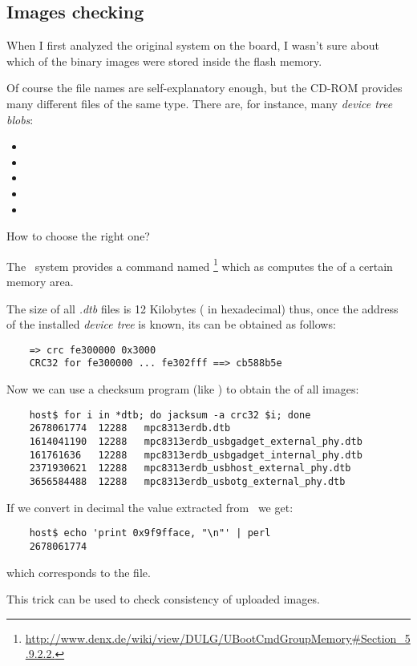 \subsection{ Images checking } \label{sub:ImagesChecking}

    When I first analyzed the original system on the board, I
    wasn't sure about which of the binary images were stored
    inside the flash memory.

    Of course the file names are self-explanatory enough, but the
    CD-ROM provides many different files of the same type. There
    are, for instance, many \emph{device tree blobs}:
    \begin{itemize}
        \item {}
        \item {}
        \item {}
        \item {}
        \item {}
    \end{itemize}
    How to choose the right one?

    The \uBoot\ system provides a command named
    \footnote{
        \url{http://www.denx.de/wiki/view/DULG/UBootCmdGroupMemory\#Section\_5.9.2.2.}
    }
    which as computes the  of a certain
    memory area.

    The size of all \emph{.dtb} files is 12 Kilobytes
    ( in hexadecimal) thus, once
    the address of the installed \emph{device tree} is known, its
     can be obtained as follows:
\begin{lstlisting}
    => crc fe300000 0x3000
    CRC32 for fe300000 ... fe302fff ==> cb588b5e
\end{lstlisting}

    Now we can use a checksum program (like ) to
    obtain the  of all images:
\begin{lstlisting}
    host$ for i in *dtb; do jacksum -a crc32 $i; done
    2678061774	12288	mpc8313erdb.dtb
    1614041190	12288	mpc8313erdb_usbgadget_external_phy.dtb
    161761636	12288	mpc8313erdb_usbgadget_internal_phy.dtb
    2371930621	12288	mpc8313erdb_usbhost_external_phy.dtb
    3656584488	12288	mpc8313erdb_usbotg_external_phy.dtb
\end{lstlisting}
    If we convert in decimal the value extracted from \uBoot\ we
    get:
\begin{lstlisting}
    host$ echo 'print 0x9f9fface, "\n"' | perl
    2678061774
\end{lstlisting}
    which corresponds to the  file.

    This trick can be used to check consistency of uploaded
    images.

